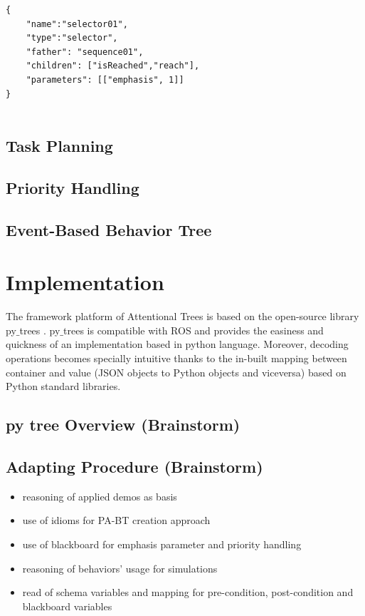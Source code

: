 \documentclass[conference]{IEEEtran}
\begin{document}
 \begin{verbatim}
{
    "name":"selector01",
    "type":"selector",
    "father": "sequence01",
    "children": ["isReached","reach"],
    "parameters": [["emphasis", 1]]
}


\end{verbatim}
\subsection{Task Planning}
\subsection{Priority Handling}
\subsection{Event-Based Behavior Tree}

\section{Implementation}
The framework platform of Attentional Trees is based on the open-source library py$\_$trees \cite{b4}. py$\_$trees is compatible with ROS and provides the easiness and quickness of an implementation based in python language. Moreover, decoding operations becomes specially intuitive thanks to the in-built mapping between container and value (JSON objects to Python objects and viceversa) based on Python standard libraries.
\subsection{py tree Overview (Brainstorm)}
\subsection{Adapting Procedure (Brainstorm)}
\begin{itemize}
\item reasoning of applied demos as basis
\item use of idioms for PA-BT creation approach 
\item use of blackboard for emphasis parameter and priority handling
\item reasoning of behaviors' usage for simulations
\item read of schema variables and mapping for pre-condition, post-condition and blackboard variables

\end{itemize}
\end{document}
